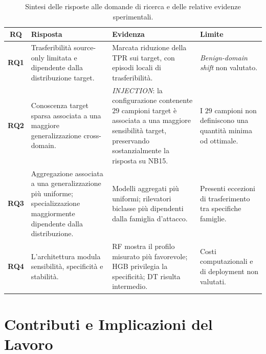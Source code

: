 \begin{table}[H]
    \centering
    \small
    \caption{Sintesi delle risposte alle domande di ricerca e delle relative evidenze sperimentali.}
    \label{tab:sintesi_rq}
    \begin{tabularx}{\textwidth}{c >{\raggedright\arraybackslash}X >{\raggedright\arraybackslash}X >{\raggedright\arraybackslash}X}
        \toprule
        \textbf{RQ} & \textbf{Risposta} & \textbf{Evidenza} & \textbf{Limite} \\
        \midrule
        \textbf{RQ1} &
        Trasferibilità source-only limitata e dipendente dalla distribuzione target. &
        Marcata riduzione della TPR sui target, con episodi locali di trasferibilità. &
        \textit{Benign-domain shift} non valutato. \\
        \addlinespace
        \textbf{RQ2} &
        Conoscenza target sparsa associata a una maggiore generalizzazione cross-domain. &
        \textit{INJECTION}: la configurazione contenente $29$ campioni target è associata a una maggiore sensibilità target, preservando sostanzialmente la risposta su NB15. &
        I $29$ campioni non definiscono una quantità minima od ottimale. \\
        \addlinespace
        \textbf{RQ3} &
        Aggregazione associata a una generalizzazione più uniforme; specializzazione maggiormente dipendente dalla distribuzione. &
        Modelli aggregati più uniformi; rilevatori biclasse più dipendenti dalla famiglia d'attacco. &
        Presenti eccezioni di trasferimento tra specifiche famiglie. \\
        \addlinespace
        \textbf{RQ4} &
        L'architettura modula sensibilità, specificità e stabilità. &
        RF mostra il profilo misurato più favorevole; HGB privilegia la specificità; DT risulta intermedio. &
        Costi computazionali e di deployment non valutati. \\
        \bottomrule
    \end{tabularx}
\end{table}




\section{Contributi e Implicazioni del Lavoro}
\label{sec:contributi_implicazioni}

